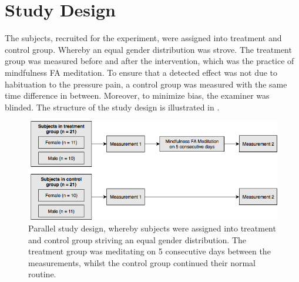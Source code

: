 \vspace{-.5cm}

\section{Study Design} 

The subjects, recruited for the experiment, were assigned into treatment and control group. Whereby an equal gender distribution was strove. The treatment group was measured before and after the intervention, which was the practice of mindfulness FA meditation. To ensure that a detected effect was not due to habituation to the pressure pain, a control group was measured with the same time difference in between. Moreover, to minimize bias, the examiner was blinded. The structure of the study design is illustrated in .

\begin{figure}[H]
	\includegraphics[width=1\textwidth]{figures/studydesign.png} 
	\caption{Parallel study design, whereby subjects were assigned into treatment and control group striving an equal gender distribution. The treatment group was meditating on 5 consecutive days between the measurements, whilst the control group continued their normal routine.}
	\label{fig:studydesign}  
\end{figure}  

